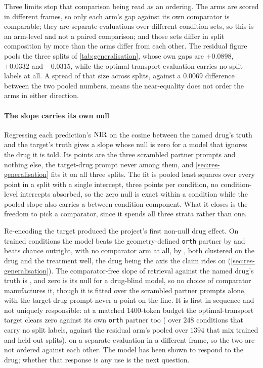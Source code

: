 Three limits stop that comparison being read as an ordering. The arms are scored
in different frames, so only each arm's gap against its own comparator is
comparable; they are separate evaluations over different condition sets, so this
is an arm-level and not a paired comparison; and those sets differ in split
composition by more than the arms differ from each other. The residual figure
pools the three splits of \cref{tab:generalisation}, whose own gaps are
$+0.0898$, $+0.0332$ and $-0.0315$, while the optimal-transport evaluation
carries no split labels at all. A spread of that size across splits, against a
$0.0069$ difference between the two pooled numbers, means the near-equality does
not order the arms in either direction.

\paragraph{The slope carries its own null} Regressing each prediction's $\textrm{NIR}$
on the cosine between the named drug's truth and the target's truth gives a
slope whose null is zero for a model that ignores the drug it is told. Its
points are the three scrambled partner prompts and nothing else, the target-drug
prompt never among them, and \cref{sec:res-generalisation} fits it on all three
splits. The fit is pooled least squares over every point in a split with a
single intercept, three points per condition, no condition-level intercepts
absorbed, so the zero null is exact within a condition while the pooled slope
also carries a between-condition component. What it closes is the freedom to
pick a comparator, since it spends all three strata rather than one.

\begin{claim}
Re-encoding the target produced the project's first non-null drug effect. On
trained conditions the model beats the geometry-defined \texttt{orth} partner by
 and beats chance outright, with no comparator arm
at all, by , both clustered on the drug and the
treatment well, the drug being the axis the claim rides on
(\cref{sec:res-generalisation}). The comparator-free slope of retrieval against
the named drug's truth is , and zero is its null for a
drug-blind model, so no choice of comparator manufactures it, though it is fitted over the
scrambled partner prompts alone, with the target-drug prompt never a point on the
line. It is first in sequence and not uniquely responsible: at a matched
$1400$-token budget the optimal-transport target clears zero against its own
\texttt{orth} partner too ( over $\num{248}$
conditions that carry no split labels, against the residual arm's
 pooled over $\num{1394}$ that mix trained and
held-out splits), on a separate evaluation in a different frame, so the two are
not ordered against each other. The model has been shown to respond to the drug;
whether that response is any use is the next question.
\end{claim}

